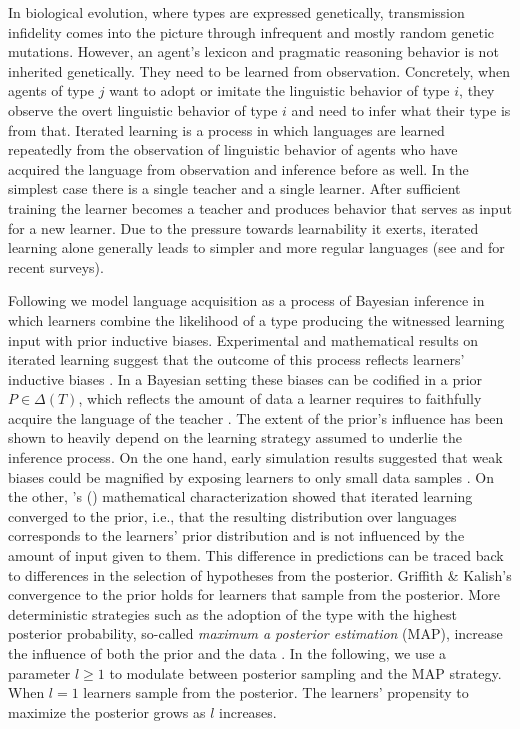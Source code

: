 \documentclass[a4paper]{article}
\newcommand{\citeposs}[2][]{\citeauthor{#2}'s (\citeyear[#1]{#2})}
\begin{document}
In biological evolution, where types are expressed genetically, transmission infidelity comes
into the picture through infrequent and mostly random genetic mutations. However, an agent's lexicon
and pragmatic reasoning behavior is not inherited genetically. They need to be learned from
observation. Concretely, when agents of type $j$ want to adopt or imitate the linguistic
behavior of type $i$, they observe the overt linguistic behavior of type $i$ and need to infer what
their type is from that. Iterated learning is a process in which languages are learned repeatedly from the observation
of linguistic behavior of agents who have acquired the language from observation and inference
before as well. In the simplest case there is a single teacher and a single
learner. After sufficient training the learner becomes a teacher and produces behavior that
serves as input for a new learner. Due to the pressure towards learnability it exerts, iterated
learning alone generally leads to simpler and more regular languages (see \citealt{kirby+etal:2014}
and \citealt{tamariz+kirby:2016} for recent surveys). 

Following \citet{griffiths+kalish:2007} we model language acquisition as a process of Bayesian
inference in which learners combine the likelihood of a type producing the witnessed learning
input with prior inductive biases. Experimental and mathematical results on iterated learning
suggest that the outcome of this process reflects learners' inductive biases
\citep[e.g.,][]{kirby+etal:2014}. In a Bayesian setting these biases can be codified in a prior
$P \in \Delta(T)$, which reflects the amount of data a learner requires to faithfully acquire
the language of the teacher \citep[cf.][450]{griffiths+kalish:2007}. The extent of the prior's
influence has been shown to heavily depend on the learning strategy assumed to underlie the
inference process. On the one hand, early simulation results suggested that weak biases could
be magnified by exposing learners to only small data samples \citep[e.g. in][]{brighton:2002}. On the other, \citeposs{griffiths+kalish:2007} mathematical
characterization showed that iterated learning converged to the prior, i.e., that the resulting
distribution over languages corresponds to the learners' prior distribution and is not
influenced by the amount of input given to them. This difference in predictions can be traced
back to differences in the selection of hypotheses from the posterior. Griffith \& Kalish's
convergence to the prior holds for learners that sample from the posterior. More deterministic
strategies such as the adoption of the type with the highest posterior probability, so-called
{\it maximum a posterior estimation} (MAP), increase the influence of both the prior and the
data \citep{griffiths+kalish:2007,kirby+etal:2007}. In the following, we use a parameter
$l\ge1$ to modulate between posterior sampling and the MAP strategy. When $l = 1$ learners
sample from the posterior. The learners' propensity to maximize the posterior grows as $l$
increases.
\end{document}
